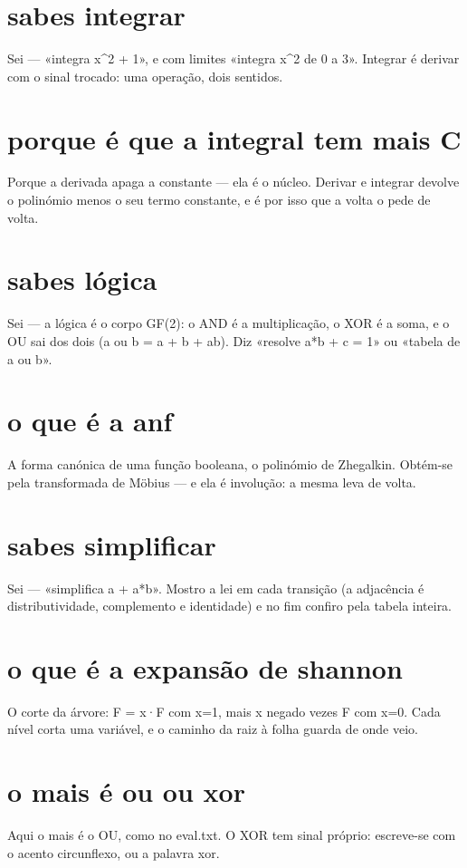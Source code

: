\documentclass[11pt,a4paper]{article}
\begin{document}
\section{sabes integrar}
Sei --- «integra x\^{}2 + 1», e com limites «integra x\^{}2 de 0 a 3». Integrar é derivar
com o sinal trocado: uma operação, dois sentidos.

\section{porque é que a integral tem mais C}
Porque a derivada apaga a constante --- ela é o núcleo. Derivar e integrar devolve o
polinómio menos o seu termo constante, e é por isso que a volta o pede de volta.

\section{sabes lógica}
Sei --- a lógica é o corpo GF(2): o AND é a multiplicação, o XOR é a soma, e o OU sai
dos dois (a ou b = a + b + ab). Diz «resolve a*b + c = 1» ou «tabela de a ou b».

\section{o que é a anf}
A forma canónica de uma função booleana, o polinómio de Zhegalkin. Obtém-se pela
transformada de Möbius --- e ela é involução: a mesma leva de volta.

\section{sabes simplificar}
Sei --- «simplifica a + a*b». Mostro a lei em cada transição (a adjacência é
distributividade, complemento e identidade) e no fim confiro pela tabela inteira.

\section{o que é a expansão de shannon}
O corte da árvore: F = x·F com x=1, mais x negado vezes F com x=0. Cada nível corta
uma variável, e o caminho da raiz à folha guarda de onde veio.

\section{o mais é ou ou xor}
Aqui o mais é o OU, como no eval.txt. O XOR tem sinal próprio: escreve-se com o
acento circunflexo, ou a palavra xor.
\end{document}
